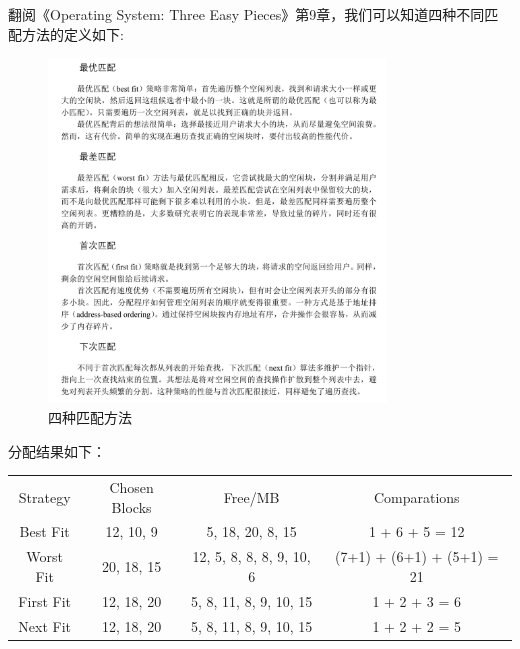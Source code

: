 
\begin{solution}

翻阅《Operating System: Three Easy Pieces》第9章，我们可以知道四种不同匹配方法的定义如下:

\begin{figure}[H]
    \centering
    \includegraphics[width=0.8\textwidth]{img/fit_strategy.png}
    \caption{四种匹配方法}
\end{figure}

分配结果如下：

\begin{table}[H]
    \centering
      \begin{tabular}{cccc}
      Strategy & Chosen Blocks & Free/MB & Comparations \\
      Best Fit & 12, 10, 9 & 5, 18, 20, 8, 15 & 1 + 6 + 5 = 12 \\
      Worst Fit & 20, 18, 15 & 12, 5, 8, 8, 8, 9, 10, 6 & (7+1) + (6+1) + (5+1) = 21 \\
      First Fit & 12, 18, 20 & 5, 8, 11, 8, 9, 10, 15 & 1 + 2 + 3 = 6 \\
      Next Fit & 12, 18, 20 & 5, 8, 11, 8, 9, 10, 15 & 1 + 2 + 2 = 5 \\
      \end{tabular}%
  \end{table}%


\end{solution}
